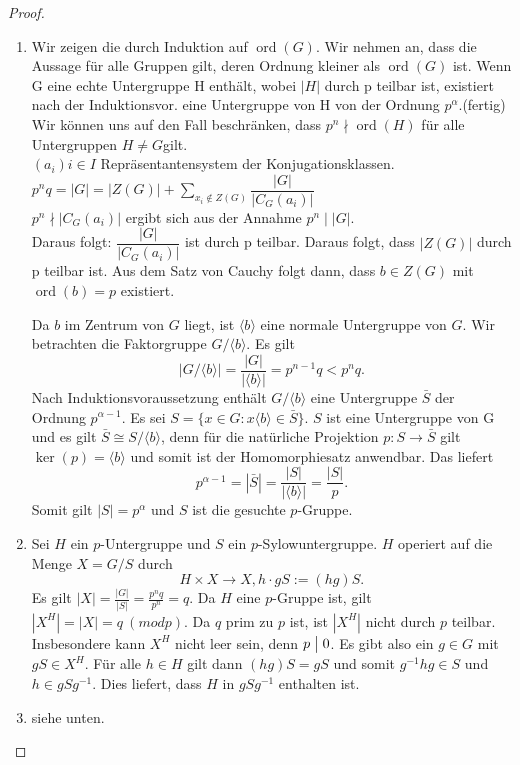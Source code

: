 \documentclass[12pt]{scrartcl} %
\DeclareMathOperator{\ord}{ord}
\newcommand{\divides}{\mathrel{\bigm|}}
\theoremstyle{definition}
\theoremstyle{remark}
\begin{document}
\begin{proof}
\begin{enumerate}
\item Wir zeigen die durch Induktion auf $\ord(G)$.
Wir nehmen an, dass die Aussage für alle Gruppen gilt, deren Ordnung kleiner als \(\ord(G)\) ist.
Wenn G eine echte Untergruppe H enthält, wobei $|H|$ durch p teilbar ist, existiert nach der Induktionsvor. eine Untergruppe von H von der Ordnung $p^\alpha$.(fertig) \\
Wir können uns auf den Fall beschränken, dass $p^n \nmid \ord(H)$ für alle Untergruppen $H\neq G$gilt. \\
$(a_{i}){i \in I}$ Repräsentantensystem der Konjugationsklassen. \\
$p^n q=|G|=|Z(G)|+\sum_{x_{i}\notin Z(G)}\dfrac{|G|}{|C_{G}(a_{i})|}$ \\
$p^n \nmid |C_{G}(a_{i})|$ ergibt sich aus der Annahme $p^n \mid |G|$. \\
Daraus folgt: $\dfrac{|G|}{|C_{G}(a_{i})|}$ ist durch p teilbar. Daraus folgt, dass $|Z(G)|$ durch p teilbar ist. Aus dem Satz von Cauchy folgt dann, dass $b \in Z(G)$ mit $\ord(b)=p$ existiert.

Da $b$ im Zentrum von $G$ liegt, ist $\langle b \rangle$ eine normale Untergruppe von $G$. Wir betrachten die Faktorgruppe $G/ \langle b \rangle$. Es gilt
	$$ |G/ \langle b \rangle | = \frac{|G|}{| \langle b \rangle |} = p^{n-1}q < p^nq. $$
	Nach Induktionsvoraussetzung enthält $G / \langle b \rangle$ eine Untergruppe $\bar{S}$ der Ordnung $p^{\alpha - 1}$. Es sei $S = \{ x \in G : x \langle b \rangle \in \bar{S} \}$. $S$ ist eine Untergruppe von G und es gilt $ \bar{S} \cong S/ \langle b \rangle$, denn für die natürliche Projektion $p: S \rightarrow \bar{S}$ gilt $\ker(p) = \langle b \rangle$ und somit ist der Homomorphiesatz anwendbar.
	Das liefert
	$$ p^{\alpha - 1} = |\bar{S}| = \frac{|S|}{| \langle b \rangle |} = \frac{|S|}{p}. $$
	Somit gilt $|S| = p^{\alpha}$ und $S$ ist die gesuchte $p$-Gruppe.
	
	\item Sei $H$ ein $p$-Untergruppe und $S$ ein $p$-Sylowuntergruppe. $H$ operiert auf die Menge $X = G/S$ durch
	$$ H \times X \rightarrow X, h \cdot gS := (hg)S.$$
	Es gilt $|X| = \frac{|G|}{|S|} = \frac{p^nq}{p^n} = q$. Da $H$ eine $p$-Gruppe ist, gilt $|X^H| = |X| = q \ (modp)$. Da $q$ prim zu $p$ ist, ist $|X^H|$ nicht durch $p$ teilbar. Insbesondere kann $X^H$ nicht leer sein, denn $p \divides 0$. Es gibt also ein $g \in G$ mit $gS \in X^H$. Für alle $h \in H$ gilt dann $(hg)S = gS$ und somit $g^{-1}hg \in S$ und $h \in gSg^{-1}$. Dies liefert, dass $H$ in $gSg^{-1}$ enthalten ist.
	
	\item siehe unten.
\end{enumerate}
\end{proof}
\end{document}
